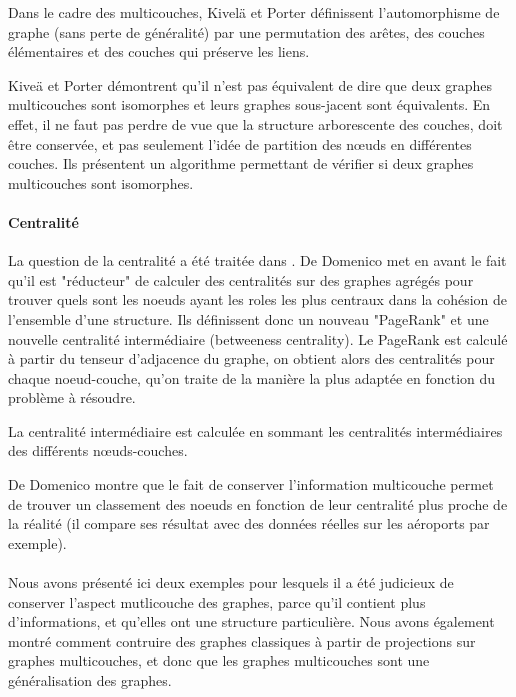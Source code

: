\documentclass[11pt,a4paper]{article}
\theoremstyle{definition}
\theoremstyle{remark}
\theoremstyle{remark}
\begin{document}
Dans le cadre des multicouches, Kivelä et Porter \cite{isoMulti} définissent l'automorphisme de graphe (sans perte de généralité) par une permutation des arêtes, des couches élémentaires et des couches qui préserve les liens.


Kiveä et Porter démontrent qu'il n'est pas équivalent de dire que deux graphes multicouches sont isomorphes et leurs graphes sous-jacent sont équivalents. En effet, il ne faut pas perdre de vue que la structure \og arborescente \fg{} des couches, doit être conservée, et pas seulement l'idée de \og partition \fg{} des nœuds en différentes couches. Ils présentent un algorithme permettant de vérifier si deux graphes multicouches sont isomorphes.

\paragraph{Centralité}

La question de la centralité a été traitée dans \cite{centraliteMulti}. De Domenico met en avant le fait qu'il est "réducteur" de calculer des centralités sur des graphes agrégés pour trouver quels sont les noeuds ayant les roles les plus centraux dans la cohésion de l'ensemble d'une structure. Ils définissent donc un nouveau "PageRank" et une nouvelle centralité intermédiaire (betweeness centrality). Le PageRank est calculé à partir du tenseur d'adjacence du graphe, on obtient alors des centralités pour chaque noeud-couche, qu'on traite de la manière la plus adaptée en fonction du problème à résoudre.

La centralité intermédiaire est calculée en sommant les centralités intermédiaires des différents nœuds-couches.

De Domenico montre que le fait de conserver l'information multicouche permet de trouver un classement des noeuds en fonction de leur centralité plus proche de la réalité (il compare ses résultat avec des données réelles sur les aéroports par exemple).

\paragraph{}

Nous avons présenté ici deux exemples pour lesquels il a été judicieux de conserver l'aspect mutlicouche des graphes, parce qu'il contient plus d'informations, et qu'elles ont une structure particulière. Nous avons également montré comment contruire des graphes \og classiques \fg{} à partir de projections sur graphes multicouches, et donc que les graphes multicouches sont une généralisation des graphes.
\end{document}
